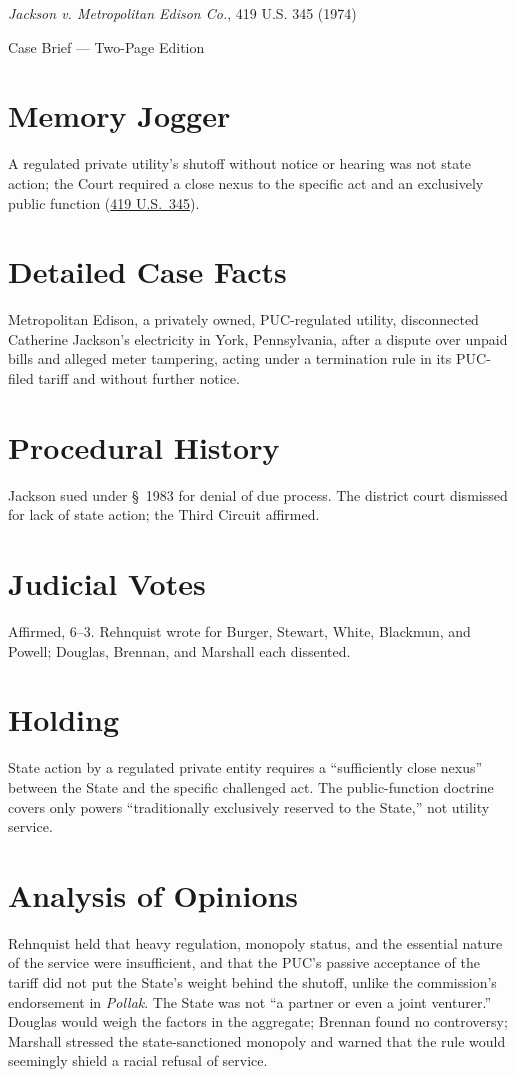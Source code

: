 \documentclass[12pt]{article}
\begin{document}
\begin{center}
{\LARGE \textit{Jackson v. Metropolitan Edison Co.}, 419 U.S. 345 (1974)\par}
\vspace{0.5em}
{\large Case Brief --- Two-Page Edition\par}
\end{center}

\section{Memory Jogger}
A regulated private utility's shutoff without notice or hearing was not state action; the Court required a close nexus to the specific act and an exclusively public function (\href{https://supreme.justia.com/cases/federal/us/419/345/}{419 U.S.\ 345}).

\section{Detailed Case Facts}
Metropolitan Edison, a privately owned, PUC-regulated utility, disconnected Catherine Jackson's electricity in York, Pennsylvania, after a dispute over unpaid bills and alleged meter tampering, acting under a termination rule in its PUC-filed tariff and without further notice.

\section{Procedural History}
Jackson sued under \S\ 1983 for denial of due process. The district court dismissed for lack of state action; the Third Circuit affirmed.

\section{Judicial Votes}
Affirmed, 6--3. Rehnquist wrote for Burger, Stewart, White, Blackmun, and Powell; Douglas, Brennan, and Marshall each dissented.

\section{Holding}
State action by a regulated private entity requires a ``sufficiently close nexus'' between the State and the specific challenged act. The public-function doctrine covers only powers ``traditionally exclusively reserved to the State,'' not utility service.

\section{Analysis of Opinions}
Rehnquist held that heavy regulation, monopoly status, and the essential nature of the service were insufficient, and that the PUC's passive acceptance of the tariff did not put the State's weight behind the shutoff, unlike the commission's endorsement in \textit{Pollak}. The State was not ``a partner or even a joint venturer.'' Douglas would weigh the factors in the aggregate; Brennan found no controversy; Marshall stressed the state-sanctioned monopoly and warned that the rule would seemingly shield a racial refusal of service.
\end{document}

